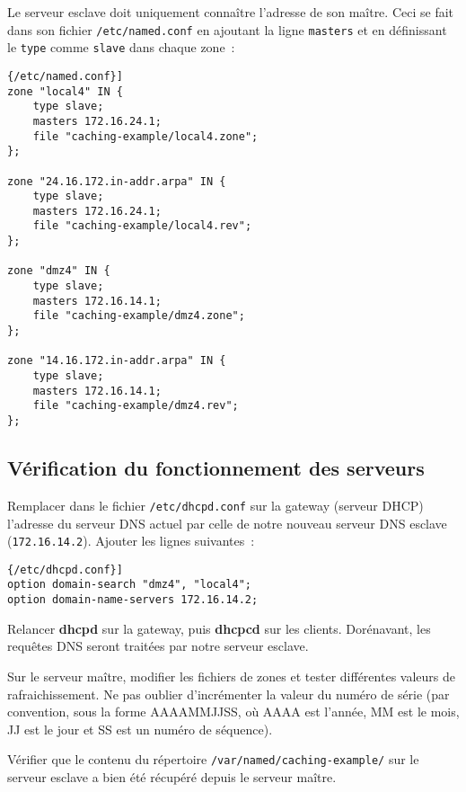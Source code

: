 \documentclass[11pt,a4paper,oneside]{article}
\newcommand{\inlinecode}{\lstinline[breaklines=true]}
\begin{document}
Le serveur esclave doit uniquement connaître l'adresse de son maître. Ceci se
fait dans son fichier \inlinecode{/etc/named.conf} en ajoutant la ligne
\inlinecode{masters} et en définissant le \inlinecode{type} comme
\inlinecode{slave} dans chaque zone~:
\begin{lstlisting}[caption=\inlinecode{/etc/named.conf}]
zone "local4" IN {
    type slave;
    masters 172.16.24.1;
    file "caching-example/local4.zone";
};

zone "24.16.172.in-addr.arpa" IN {
    type slave;
    masters 172.16.24.1;
    file "caching-example/local4.rev";
};

zone "dmz4" IN {
    type slave;
    masters 172.16.14.1;
    file "caching-example/dmz4.zone";
};

zone "14.16.172.in-addr.arpa" IN {
    type slave;
    masters 172.16.14.1;
    file "caching-example/dmz4.rev";
};
\end{lstlisting}

\subsection{Vérification du fonctionnement des serveurs}

Remplacer dans le fichier \inlinecode{/etc/dhcpd.conf} sur la gateway (serveur
DHCP) l'adresse du serveur DNS actuel par celle de notre nouveau serveur DNS
esclave (\inlinecode{172.16.14.2}). Ajouter les lignes suivantes~:
\begin{lstlisting}[caption=\inlinecode{/etc/dhcpd.conf}]
option domain-search "dmz4", "local4";
option domain-name-servers 172.16.14.2;
\end{lstlisting}

Relancer \textbf{dhcpd} sur la gateway, puis \textbf{dhcpcd} sur les clients.
Dorénavant, les requêtes DNS seront traitées par notre serveur esclave.

Sur le serveur maître, modifier les fichiers de zones et tester différentes
valeurs de rafraichissement. Ne pas oublier d'incrémenter la valeur du numéro de
série (par convention, sous la forme AAAAMMJJSS, où AAAA est l'année, MM est le
mois, JJ est le jour et SS est un numéro de séquence).

Vérifier que le contenu du répertoire \inlinecode{/var/named/caching-example/}
sur le serveur esclave a bien été récupéré depuis le serveur maître.
\end{document}
